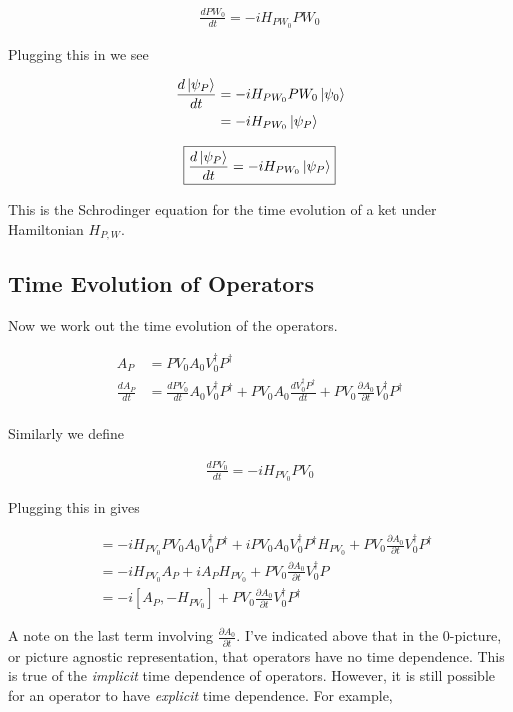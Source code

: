 \documentclass[12pt]{article}
\newcommand{\ddt}[1]{\frac{d #1}{dt}}
\newcommand{\ppt}[1]{\frac{\partial #1}{\partial t}}
\begin{document}
\begin{align}
\ddt{PW_0} = -i H_{PW_0} P W_0
\end{align}

Plugging this in we see

\begin{align}
\ddt{\ket{\psi_P}} &= -i H_{PW_0} P W_0 \ket{\psi_0}\\
&= -i H_{PW_0} \ket{\psi_P}
\end{align}

\begin{align}
\boxed{
\ddt{\ket{\psi_P}} = -iH_{PW_0} \ket{\psi_P}	
}
\end{align}

This is the Schrodinger equation for the time evolution of a ket under Hamiltonian $H_{P,W}$.

\subsection{Time Evolution of Operators}

Now we work out the time evolution of the operators.

\begin{align}
A_P &= PV_0 A_0 V_0^{\dag}P^{\dag}\\
\ddt{A_P} &= \ddt{PV_0} A_0 V_0^{\dag}P^{\dag} + PV_0 A_0 \ddt{V_0^{\dag} P^{\dag}} + PV_0 \ppt{A_0} V_0^{\dag}P^{\dag}\\
\end{align}

Similarly we define

\begin{align}
\ddt{PV_0} = -i H_{PV_0} PV_0
\end{align}

Plugging this in gives

\begin{align}
&= -i H_{PV_0} P V_0 A_0 V_0^{\dag}P^{\dag} + i PV_0 A_0 V_0^{\dag}P^{\dag} H_{PV_0} + PV_0\ppt{A_0}V_0^{\dag}P^{\dag}\\
&= -i H_{PV_0} A_P + i A_P H_{PV_0} + PV_0 \ppt{A_0} V_0^{\dag}P\\
&= -i [A_P,-H_{PV_0}] + PV_0\ppt{A_0}V_0^{\dag}P^{\dag}
\end{align}

A note on the last term involving $\ppt{A_0}$. I've indicated above that in the $0$-picture, or picture agnostic representation, that operators have no time dependence. This is true of the \textit{implicit} time dependence of operators. However, it is still possible for an operator to have \textit{explicit} time dependence. For example,
\end{document}
